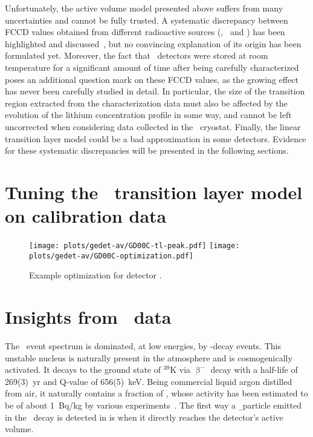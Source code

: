 Unfortunately, the active volume model presented above suffers from many uncertainties and
cannot be fully trusted. A systematic discrepancy between FCCD values obtained from
different radioactive sources (\Am, \Ba\ and \Co) has been highlighted and
discussed~\cite{Lehnert2016}, but no convincing explanation of its origin has been
formulated yet. Moreover, the fact that \bege\ detectors were stored at room temperature
for a significant amount of time after being carefully characterized poses an additional
question mark on these FCCD values, as the growing effect has never been carefully studied
in detail. In particular, the size of the transition region extracted from the
characterization data must also be affected by the evolution of the lithium concentration
profile in some way, and cannot be left uncorrected when considering data collected in the
\gerda\ cryostat. Finally, the linear transition layer model could be a bad approximation
in some detectors. Evidence for these systematic discrepancies will be presented in the
following sections.

\section{Tuning the \bege\ transition layer model on calibration data}%
\label{sec:gedetav:calib-optim}

\begin{table}
  \centering
  \caption{%
    \bege\ dead layer fractions obtained from calibration data. 
  }\label{tab:gedetav:calib-optim}
  
\end{table}

\begin{figure}
  \centering
  \texttt{[image: plots/gedet-av/GD00C-tl-peak.pdf]}%
  \texttt{[image: plots/gedet-av/GD00C-optimization.pdf]}
  \caption{%
    Example optimization for detector . 
  }\label{fig:gedetav:example-optim}
\end{figure}

\section{Insights from \Arl\ data}%
\label{src:gedetav:ar39}

The \gerda\ event spectrum is dominated, at low energies, by \Arl-decay events. This
unstable nucleus is naturally present in the atmosphere and is cosmogenically activated.
It decays to the ground state of $^{39}$K via $\upbeta^-$ decay with a half-life of
269(3)~yr and Q-value of 656(5)~keV. Being commercial liquid argon distilled from air, it
naturally contains a fraction of \Arl, whose activity has been estimated to be of about
1~Bq/kg by various experiments~\cite{Ajaj2019, Calvo2017, Benetti2006, Loosli1983}.
\newpar
The first way a \b\ particle emitted in the \Arl\ decay is detected in \gerda is when it
directly reaches the detector's active volume.

